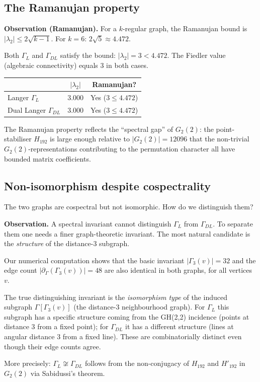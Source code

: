 \documentclass[11pt,a4paper]{article}
\theoremstyle{plain}
\theoremstyle{definition}
\begin{document}
\subsection{The Ramanujan property}

\begin{tcolorbox}[breakable, colback=yellow!12, colframe=yellow!12,
  boxrule=0pt, sharp corners]
\textbf{Observation (Ramanujan).}
For a $k$-regular graph, the Ramanujan bound is $|\lambda_2| \leq 2\sqrt{k-1}$.
For $k=6$: $2\sqrt{5} \approx 4.472$.

Both $\Gamma_L$ and $\Gamma_{DL}$ satisfy the bound: $|\lambda_2| = 3 < 4.472$.
The Fiedler value (algebraic connectivity) equals $3$ in both cases.
\begin{center}
\begin{tabular}{lcc}
\toprule
& $|\lambda_2|$ & Ramanujan? \\
\midrule
Langer $\Gamma_L$ & $3.000$ & Yes ($3 \leq 4.472$) \\
Dual Langer $\Gamma_{DL}$ & $3.000$ & Yes ($3 \leq 4.472$) \\
\bottomrule
\end{tabular}
\end{center}
The Ramanujan property reflects the ``spectral gap'' of $G_2(2)$: the
point-stabiliser $H_{192}$ is large enough relative to $|G_2(2)|=12096$
that the non-trivial $G_2(2)$-representations contributing to the permutation
character all have bounded matrix coefficients.
\end{tcolorbox}

\subsection{Non-isomorphism despite cospectrality}

The two graphs are cospectral but not isomorphic. How do we distinguish them?

\begin{tcolorbox}[breakable, colback=yellow!12, colframe=yellow!12,
  boxrule=0pt, sharp corners]
\textbf{Observation.}
A spectral invariant cannot distinguish $\Gamma_L$ from $\Gamma_{DL}$.
To separate them one needs a finer graph-theoretic invariant. The most
natural candidate is the \emph{structure} of the distance-3 subgraph.

Our numerical computation shows that the basic invariant
$|\Gamma_3(v)| = 32$ and the edge count $|\partial_{\Gamma}(\Gamma_3(v))| = 48$
are also identical in both graphs, for all vertices $v$.

The true distinguishing invariant is the \emph{isomorphism type} of
the induced subgraph $\Gamma[\Gamma_3(v)]$ (the distance-3 neighbourhood graph).
For $\Gamma_L$ this subgraph has a specific structure coming from the
GH(2,2) incidence (points at distance 3 from a fixed point); for
$\Gamma_{DL}$ it has a different structure (lines at angular distance 3
from a fixed line). These are combinatorially distinct even though their
edge counts agree.

More precisely: $\Gamma_L \not\cong \Gamma_{DL}$ follows from the
non-conjugacy of $H_{192}$ and $H'_{192}$ in $G_2(2)$ via Sabidussi's theorem.
\end{tcolorbox}
\end{document}
